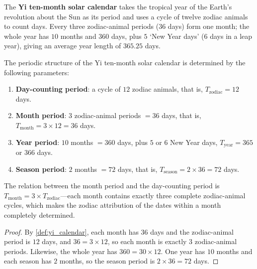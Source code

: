 \begin{definition}\label{def:yi_calendar}
The \textbf{Yi ten-month solar calendar} takes the tropical year of the Earth's revolution about the Sun as its period and uses a cycle of twelve zodiac animals to count days. Every three zodiac-animal periods (\(36\) days) form one month; the whole year has \(10\) months and \(360\) days, plus \(5\) `New Year days' (\(6\) days in a leap year), giving an average year length of \(365.25\) days.
\end{definition}

\begin{proposition}\label{prop:yi_calendar_structure}
The periodic structure of the Yi ten-month solar calendar is determined by the following parameters:
\begin{enumerate}[label=(\roman*)]
    \item \textbf{Day-counting period}: a cycle of \(12\) zodiac animals, that is, \(T_{\text{zodiac}}=12\) days.
    \item \textbf{Month period}: \(3\) zodiac-animal periods \(=36\) days, that is, \(T_{\text{month}}=3\times 12=36\) days.
    \item \textbf{Year period}: \(10\) months \(=360\) days, plus \(5\) or \(6\) New Year days, \(T_{\text{year}}=365\) or \(366\) days.
    \item \textbf{Season period}: \(2\) months \(=72\) days, that is, \(T_{\text{season}}=2\times 36=72\) days.
\end{enumerate}
The relation between the month period and the day-counting period is \(T_{\text{month}}=3\times T_{\text{zodiac}}\)---each month contains exactly three complete zodiac-animal cycles, which makes the zodiac attribution of the dates within a month completely determined.
\end{proposition}

\begin{proof}
By \cref{def:yi_calendar}, each month has \(36\) days and the zodiac-animal period is \(12\) days, and \(36=3\times 12\), so each month is exactly \(3\) zodiac-animal periods. Likewise, the whole year has \(360=30\times 12\). One year has \(10\) months and each season has \(2\) months, so the season period is \(2\times 36=72\) days.
\end{proof}

